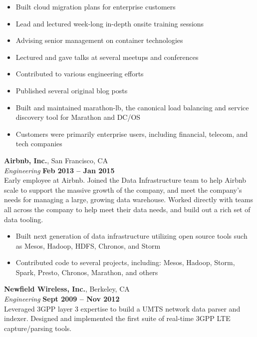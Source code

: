 \documentclass[margin,line]{resume}
\begin{document}
\begin{resume}
    \begin{itemize}
    \item Built cloud migration plans for enterprise customers
    \item Lead and lectured week-long in-depth onsite training sessions
    \item Advising senior management on container technologies
    \item Lectured and gave talks at several meetups and conferences
    \item Contributed to various engineering efforts
    \item Published several original blog posts
    \item Built and maintained marathon-lb, the canonical load balancing and
     service discovery tool for Marathon and DC/OS
    \item Customers were primarily enterprise users, including financial,
     telecom, and tech companies
    \end{itemize}

    \textbf{Airbnb, Inc.}, San Francisco, CA \vspace{2mm}\\\vspace{1mm}%
    \textsl{Engineering} \hfill \textbf{Feb 2013 -- Jan 2015}\\
    Early employee at Airbnb. Joined the Data Infrastructure team to help
    Airbnb scale to support the massive growth of the company, and meet the
    company's needs for managing a large, growing data warehouse. Worked
    directly with teams all across the company to help meet their data needs,
    and build out a rich set of data tooling.

    \begin{itemize}
    \item Built next generation of data infrastructure utilizing open source
     tools such as Mesos, Hadoop, HDFS, Chronos, and Storm
    \item Contributed code to several projects, including: Mesos, Hadoop,
     Storm, Spark, Presto, Chronos, Marathon, and others
    \end{itemize}

    \textbf{Newfield Wireless, Inc.}, Berkeley, CA \vspace{2mm}\\\vspace{1mm}%
    \textsl{Engineering} \hfill \textbf{Sept 2009 -- Nov 2012}\\
    Leveraged 3GPP layer 3 expertise to build a UMTS network data parser and
    indexer. Designed and implemented the first suite of real-time 3GPP LTE
    capture/parsing tools.


\end{resume}
\end{document}
